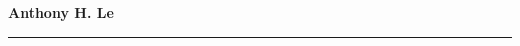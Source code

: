 \documentclass[10pt]{letter}
\begin{document}
\begin{center}
\textbf{\Large \textbf{Anthony H. Le}} \\
\end{center}
\vspace{-10pt}
\vspace{-10pt}




\par\noindent\rule{\textwidth}{0.5pt}

\end{document}
